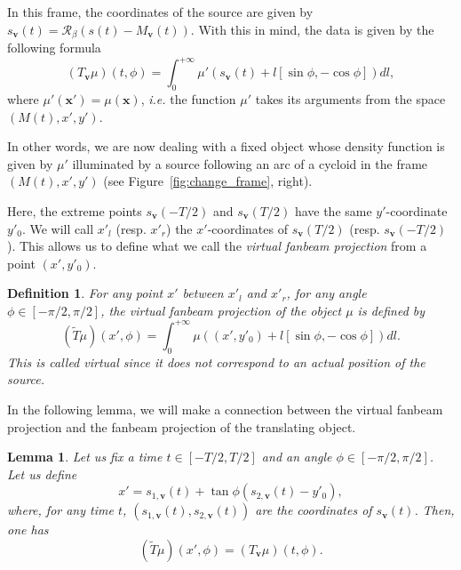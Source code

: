 \documentclass[9pt,technote]{IEEEtran}
\numberwithin{equation}{section}
\newcommand{\ie}{\emph{i.e.} }
\newcommand{\bx}{\mathbf{x}}
\newcommand{\bv}{\mathbf{v}}
\newcommand{\Mbv}{M_{\mathbf{v}}}
\newcommand{\Tbv}{T_{\mathbf{v}}}
\newcommand{\sbv}{s_{\mathbf{v}}}
\newtheorem{definition}{Definition}
\newtheorem{lemma}{Lemma}
\begin{document}
In this frame, the coordinates of the source are given by $\sbv(t)=\mathcal{R}_{\beta} \left( s(t)-\Mbv(t) \right)$. With this in mind, the data is given by the following formula
\begin{equation}
	(\Tbv\mu)(t,\phi) = \int_0^{+\infty} \mu' \left( s_{\bv}(t) + l \left[ \sin \phi, -\cos \phi \right] \right) dl,
\end{equation}
where $\mu'(\bx')=\mu(\bx)$, \ie the function $\mu'$ takes its arguments from the space $\left(M(t), x', y'\right)$.

In other words, we are now dealing with a fixed object whose density function is given by $\mu'$ illuminated by a source following an arc of a cycloid in the frame $\left(M(t), x', y'\right)$ (see Figure~\ref{fig:change_frame}, right).

Here, the extreme points $\sbv(-T/2)$ and $\sbv(T/2)$ have the same $y'$-coordinate $y'_0$. We will call $x'_l$ (resp. $x'_r$) the $x'$-coordinates of $\sbv(T/2)$ (resp. $\sbv(-T/2)$). This allows us to define what we call the \emph{virtual fanbeam projection} from a point $(x',y'_0)$.
\begin{definition}
	For any point $x'$ between $x'_l$ and $x'_r$, for any angle $\phi \in \left[ -\pi/2, \pi/2\right]$, the \emph{virtual fanbeam projection} of the object $\mu$ is defined by
\begin{equation}
	\left( \tilde{T}\mu	\right)(x',\phi) = \int_0^{+\infty} \mu \left( (x',y'_0) + l \left[ \sin \phi, -\cos \phi \right] \right) dl.
\end{equation}
This is called \emph{virtual} since it does not correspond to an actual position of the source.
\end{definition}

In the following lemma, we will make a connection between the virtual fanbeam projection and the fanbeam projection of the translating object.
\begin{lemma}
	Let us fix a time $t \in \left[ -T/2, T/2\right]$ and an angle $\phi \in \left[ -\pi/2, \pi/2\right]$. Let us define
	\begin{equation}
		x' = s_{1,\bv}(t) + \tan \phi \left( s_{2,\bv}(t) - y'_0 \right),
	\end{equation}
	where, for any time $t$, $\left( s_{1,\bv}(t), s_{2,\bv}(t) \right)$ are the coordinates of $\sbv(t)$.
	Then, one has
	\begin{equation}
		\left( \tilde{T}\mu	\right)(x',\phi) = \left( \Tbv \mu \right)(t,\phi).
	\end{equation}
\label{lem:T_x_t}
\end{lemma}
\end{document}
